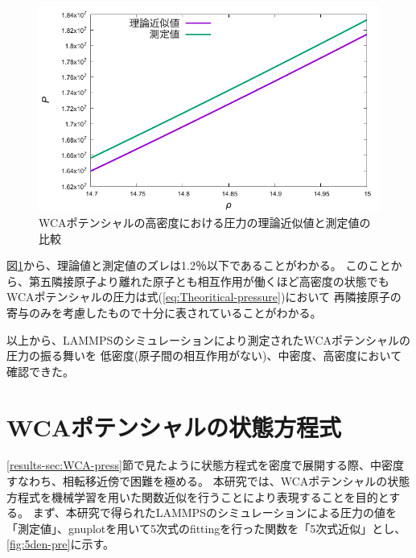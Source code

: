 \documentclass[titlepage]{jsreport}
\begin{document}
{{{\begin{figure}[htbp]
    \begin{center}
        \includegraphics[width=14cm]{fig/highden_compare:den-pre.pdf}
    \end{center}
    \caption{WCAポテンシャルの高密度における圧力の理論近似値と測定値の比較}
    \label{fig:highden_compare:den-pre}
\end{figure}

図\ref{fig:highden_compare:den-pre}から、理論値と測定値のズレは1.2％以下であることがわかる。
このことから、第五隣接原子より離れた原子とも相互作用が働くほど高密度の状態でもWCAポテンシャルの圧力は式(\ref{eq:Theoritical-pressure})において
再隣接原子の寄与のみを考慮したもので十分に表されていることがわかる。



以上から、LAMMPSのシミュレーションにより測定されたWCAポテンシャルの圧力の振る舞いを
低密度(原子間の相互作用がない)、中密度、高密度において確認できた。



\section{WCAポテンシャルの状態方程式}\label{results-sec:WCA-equation}
\ref{results-sec:WCA-press}節で見たように状態方程式を密度で展開する際、中密度すなわち、相転移近傍で困難を極める。
本研究では、WCAポテンシャルの状態方程式を機械学習を用いた関数近似を行うことにより表現することを目的とする。
まず、本研究で得られたLAMMPSのシミュレーションによる圧力の値を「測定値」、gnuplotを用いて5次式のfittingを行った関数を「5次式近似」とし、
\ref{fig:5den-pre}に示す。


}}}
\end{document}
